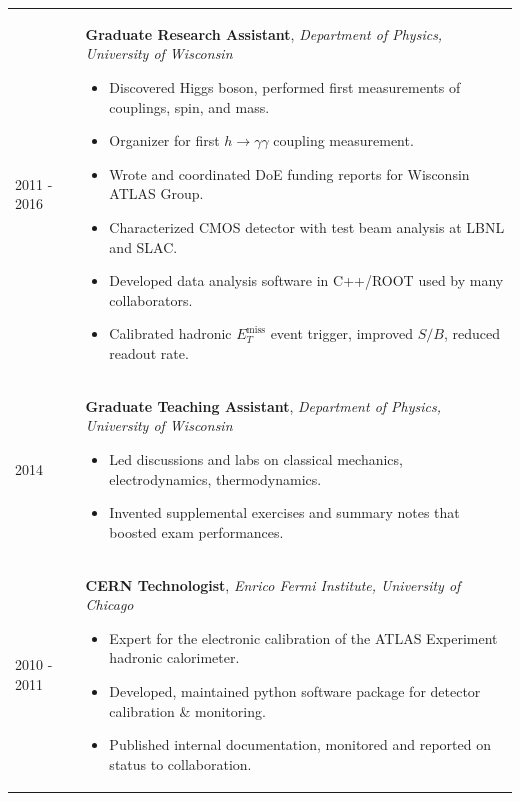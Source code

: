 \documentclass{letter}
\begin{document}
\begin{tabular}{p{}p{}}
	2011 - 2016
	&
	\textbf{Graduate Research Assistant}, \textit{Department of Physics, University of Wisconsin} \newline
	\vspace{-10pt}      %
	\begin{itemize}
		\itemsep0em
		\renewcommand{\labelitemi}{\tiny$\blacksquare$}
    		\item Discovered Higgs boson, performed first measurements of couplings, spin, and mass. 
    		\item Organizer for first $h\rightarrow\gamma\gamma$ coupling measurement. 
		\item Wrote and coordinated DoE funding reports for Wisconsin ATLAS Group.
    		\item Characterized CMOS detector with test beam analysis at LBNL and SLAC. 
    		\item Developed data analysis software in C++/ROOT used by many collaborators.
    		\item Calibrated hadronic $E_{T}^{\textrm{miss}}$ event trigger, improved $S/B$, reduced readout rate. 
	\end{itemize}
\\
	2014 
	& 
	\textbf{Graduate Teaching Assistant}, \textit{Department of Physics, University of Wisconsin} \newline
	\vspace{-10pt}      %
	\begin{itemize}
		\itemsep0em
		\renewcommand{\labelitemi}{\tiny$\blacksquare$} 
		\item Led discussions and labs on classical mechanics, electrodynamics, thermodynamics.
    		\item Invented supplemental exercises and summary notes that boosted exam performances.
	\end{itemize}
\\
	2010 - 2011
	&
	\textbf{CERN Technologist}, \textit{Enrico Fermi Institute, University of Chicago} \newline
	\vspace{-10pt}      %
	\begin{itemize}
		\itemsep0em
		\renewcommand{\labelitemi}{\tiny$\blacksquare$} 
   		\item Expert for the electronic calibration of the ATLAS Experiment hadronic calorimeter.
   		\item Developed, maintained python software package for detector calibration \& monitoring.
    		\item Published internal documentation, monitored and reported on status to collaboration.
	\end{itemize}
\end{tabular}
\end{document}
